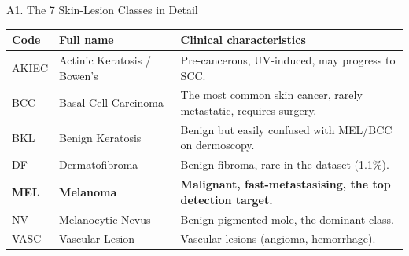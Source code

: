 \documentclass[10pt, aspectratio=169]{beamer}
\begin{document}
\begin{frame}{A1. The 7 Skin-Lesion Classes in Detail}
    \scriptsize
    \begin{table}[]
        \centering
        \begin{tabular}{lp{4cm}p{5.5cm}}
        \toprule
        \rowcolor{usthblue!25} \textbf{Code} & \textbf{Full name} & \textbf{Clinical characteristics} \\
        \midrule
        AKIEC & Actinic Keratosis / Bowen's & Pre-cancerous, UV-induced, may progress to SCC. \\
        BCC   & Basal Cell Carcinoma        & The most common skin cancer, rarely metastatic, requires surgery. \\
        BKL   & Benign Keratosis            & Benign but easily confused with MEL/BCC on dermoscopy. \\
        DF    & Dermatofibroma              & Benign fibroma, rare in the dataset (1.1\%). \\
        \textbf{MEL} & \textbf{Melanoma}    & \textbf{Malignant, fast-metastasising, the top detection target.} \\
        NV    & Melanocytic Nevus           & Benign pigmented mole, the dominant class. \\
        VASC  & Vascular Lesion             & Vascular lesions (angioma, hemorrhage). \\
        \bottomrule
        \end{tabular}
    \end{table}
    \vspace{0.2cm}
\end{frame}
\end{document}

